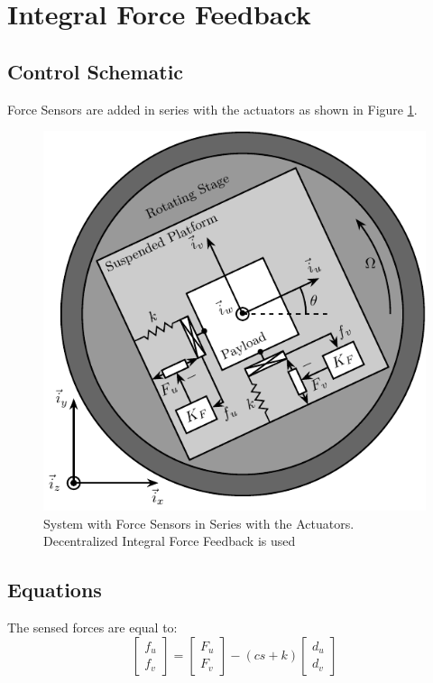 \documentclass{ISMA_USD2020}
\begin{document}
\section{Integral Force Feedback}
\label{sec:org2e8c85f}
\subsection{Control Schematic}
\label{sec:org50b6359}

Force Sensors are added in series with the actuators as shown in Figure \ref{fig:system_iff}.

\begin{figure}[htbp]
\centering
\includegraphics[scale=1]{figs/system_iff.pdf}
\caption{\label{fig:system_iff}System with Force Sensors in Series with the Actuators. Decentralized Integral Force Feedback is used}
\end{figure}

\subsection{Equations}
\label{sec:org99c13a7}
The sensed forces are equal to:
\begin{equation}
\begin{bmatrix} f_{u} \\ f_{v} \end{bmatrix} =
\begin{bmatrix} F_u \\ F_v \end{bmatrix} - (c s + k)
\begin{bmatrix} d_u \\ d_v \end{bmatrix}
\end{equation}
\end{document}
